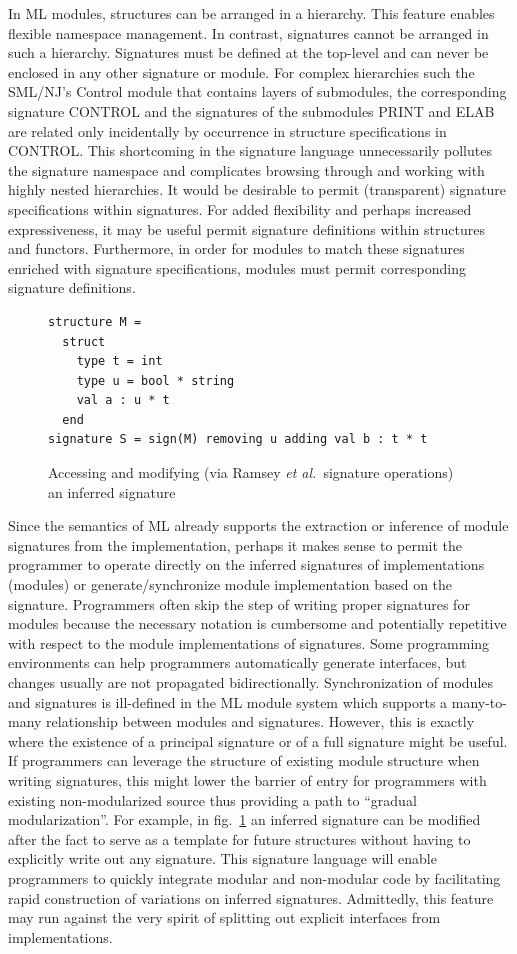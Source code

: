 \documentclass[12pt]{article}
\newcommand{\etal}{{\it et al.}}
\begin{document}
In ML modules, structures can be arranged in a hierarchy. This feature enables flexible namespace management. In contrast, signatures cannot be arranged in such a hierarchy. Signatures must be defined at the top-level and can never be enclosed in any other signature or module. For complex hierarchies such the SML/NJ's Control module that contains layers of submodules, the corresponding signature CONTROL and the signatures of the submodules PRINT and ELAB are related only incidentally by occurrence in structure specifications in CONTROL. This shortcoming in the signature language unnecessarily pollutes the signature namespace and complicates browsing through and working with highly nested hierarchies. It would be desirable to permit (transparent) signature specifications within signatures. For added flexibility and perhaps increased expressiveness, it may be useful permit signature definitions within structures and functors. Furthermore, in order for modules to match these signatures enriched with signature specifications, modules must permit corresponding signature definitions. 

\begin{figure}
\begin{lstlisting}
structure M = 
  struct 
    type t = int 
    type u = bool * string 
    val a : u * t
  end 
signature S = sign(M) removing u adding val b : t * t	
\end{lstlisting}	
\caption{Accessing and modifying (via Ramsey \etal~signature operations) an inferred signature}
\label{fig:inferred}
\end{figure}

Since the semantics of ML already supports the extraction or inference of module signatures from the implementation, perhaps it makes sense to permit the programmer to operate directly on the inferred signatures of implementations (modules) or generate/synchronize module implementation based on the signature. Programmers often skip the step of writing proper signatures for modules because the necessary notation is cumbersome and potentially repetitive with respect to the module implementations of signatures. Some programming environments can help programmers automatically generate interfaces, but changes usually are not propagated bidirectionally. Synchronization of modules and signatures is ill-defined in the ML module system which supports a many-to-many relationship between modules and signatures. However, this is exactly where the existence of a principal signature or of a full signature might be useful. If programmers can leverage the structure of existing module structure when writing signatures, this might lower the barrier of entry for programmers with existing non-modularized source thus providing a path to ``gradual modularization''. For example, in fig.~\ref{fig:inferred} an inferred signature can be modified after the fact to serve as a template for future structures without having to explicitly write out any signature. This signature language will enable programmers to quickly integrate modular and non-modular code by facilitating rapid construction of variations on inferred signatures. Admittedly, this feature may run against the very spirit of splitting out explicit interfaces from implementations. 
\end{document}
